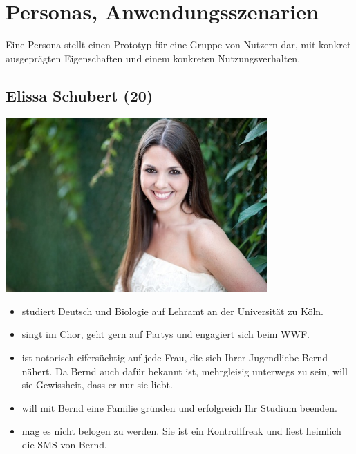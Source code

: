 \documentclass[10pt, a4paper, oneside, titlepage]{scrartcl} %
\begin{document}
   	\section{Personas, Anwendungsszenarien}
   	Eine Persona stellt einen Prototyp für eine Gruppe von Nutzern dar, mit konkret ausgeprägten Eigenschaften und einem konkreten Nutzungsverhalten.
   	
	\subsection{Elissa Schubert (20)}
	\begin{center}
		\includegraphics[width=10.0cm]{persona_01.jpg}
	\end{center}
	\begin{itemize}
		\item{}studiert Deutsch und Biologie auf Lehramt an der Universität zu Köln.
		\item{}singt im Chor, geht gern auf Partys und engagiert sich beim WWF.
		\item{}ist notorisch eifersüchtig auf jede Frau, die sich Ihrer Jugendliebe Bernd nähert. Da Bernd auch dafür bekannt ist, mehrgleisig unterwegs zu sein, 		will sie Gewissheit, dass er nur sie liebt.
		\item{}will mit Bernd eine Familie gründen und erfolgreich Ihr Studium beenden.
		\item{}mag es nicht belogen zu werden. Sie ist ein Kontrollfreak und liest heimlich die SMS von Bernd.
	\end{itemize}	   
   
\end{document}
